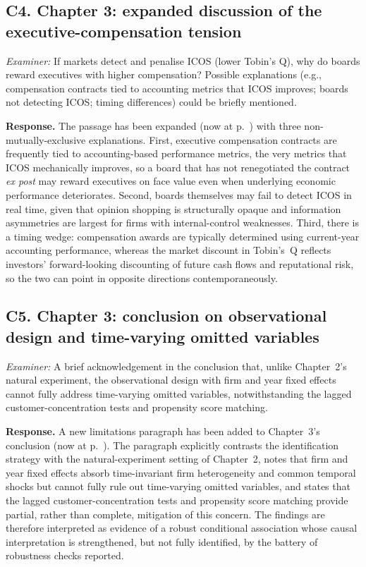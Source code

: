 \documentclass[11pt,a4paper]{article}
\newcommand{\nowat}[1]{(now at p.~\pageref{#1})}
\begin{document}
\subsection*{C4. Chapter 3: expanded discussion of the executive-compensation tension}
\textit{Examiner:} If markets detect and penalise ICOS (lower Tobin's Q), why do boards reward executives with higher compensation? Possible explanations (e.g., compensation contracts tied to accounting metrics that ICOS improves; boards not detecting ICOS; timing differences) could be briefly mentioned.

\noindent\textbf{Response.} The passage has been expanded \nowat{viva:c3-comp} with three non-mutually-exclusive explanations. First, executive compensation contracts are frequently tied to accounting-based performance metrics, the very metrics that ICOS mechanically improves, so a board that has not renegotiated the contract \emph{ex post} may reward executives on face value even when underlying economic performance deteriorates. Second, boards themselves may fail to detect ICOS in real time, given that opinion shopping is structurally opaque and information asymmetries are largest for firms with internal-control weaknesses. Third, there is a timing wedge: compensation awards are typically determined using current-year accounting performance, whereas the market discount in Tobin's~Q reflects investors' forward-looking discounting of future cash flows and reputational risk, so the two can point in opposite directions contemporaneously.

\subsection*{C5. Chapter 3: conclusion on observational design and time-varying omitted variables}
\textit{Examiner:} A brief acknowledgement in the conclusion that, unlike Chapter~2's natural experiment, the observational design with firm and year fixed effects cannot fully address time-varying omitted variables, notwithstanding the lagged customer-concentration tests and propensity score matching.

\noindent\textbf{Response.} A new limitations paragraph has been added to Chapter~3's conclusion \nowat{viva:c3-cov}. The paragraph explicitly contrasts the identification strategy with the natural-experiment setting of Chapter~2, notes that firm and year fixed effects absorb time-invariant firm heterogeneity and common temporal shocks but cannot fully rule out time-varying omitted variables, and states that the lagged customer-concentration tests and propensity score matching provide partial, rather than complete, mitigation of this concern. The findings are therefore interpreted as evidence of a robust conditional association whose causal interpretation is strengthened, but not fully identified, by the battery of robustness checks reported.
\end{document}
